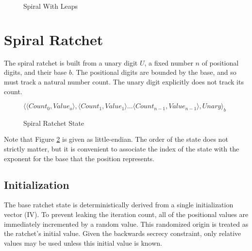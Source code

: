 \documentclass{article}
\begin{document}
	\begin{figure}[h]
		\centering
		
		
		\caption{Spiral With Leaps}
		\label{spiral-metaphor}
	\end{figure}

	\FloatBarrier
	
	\section{Spiral Ratchet}
	
	The spiral ratchet is built from a unary digit $U$, a fixed number $n$ of positional digits, and their base $b$. The positional digits are bounded by the base, and so must track a natural number count. The unary digit explicitly does not track its count.
	
	\begin{figure}[h]
		\centering
		
		$\langle \langle Count_{0}, Value_{o} \rangle, \langle Count_{1}, Value_{1} \rangle \ldots \langle Count_{n-1}, Value_{n-1} \rangle, Unary \rangle_{b}$
		
		\caption{Spiral Ratchet State}
		\label{fig:state}
	\end{figure}

	Note that Figure \ref{fig:state} is given as little-endian. The order of the state does not strictly matter, but it is convenient to associate the index of the state with the exponent for the base that the position represents.
	
	\subsection{Initialization}
	
	The base ratchet state is deterministically derived from a single initialization vector (IV). To prevent leaking the iteration count, all of the positional values are immediately incremented by a random value. This randomized origin is treated as the ratchet's initial value. Given the backwards secrecy constraint, only relative values may be used unless this initial value is known.
	
\end{document}
